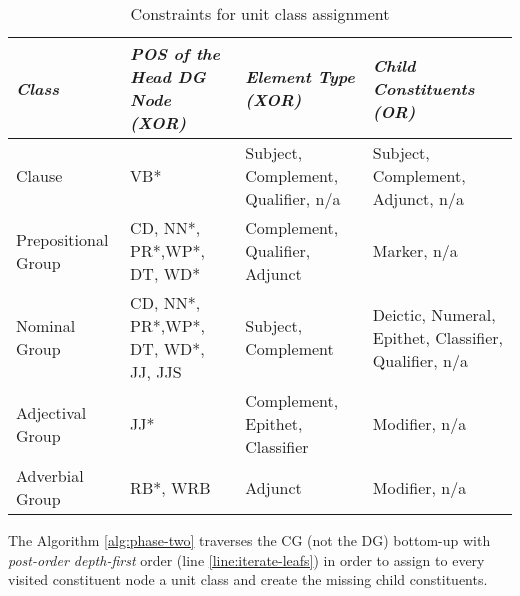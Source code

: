 \begin{table}[!ht]
\centering
\begin{tabulary}{\textwidth}{|L|L|L|L|}
\hline
\textit{Class} & \textit{POS of the Head DG Node (XOR)} & \textit{Element Type (XOR)} & \textit{Child Constituents (OR)} \\ \hline
Clause              & VB* & Subject, Complement, Qualifier, n/a & Subject, Complement, Adjunct, n/a \\ \hline
Prepositional Group & CD, NN*, PR*,WP*, DT, WD* & Complement, Qualifier, Adjunct  & Marker, n/a \\ \hline
Nominal Group       & CD, NN*, PR*,WP*, DT, WD*, JJ, JJS & Subject, Complement & Deictic, Numeral, Epithet, Classifier, Qualifier, n/a \\ \hline
Adjectival Group    & JJ* & Complement, Epithet, Classifier & Modifier, n/a \\ \hline
Adverbial Group     & RB*, WRB & Adjunct & Modifier, n/a \\ \hline
\end{tabulary}
\caption{Constraints for unit class assignment}
\label{tab:class-constitions}
\end{table}

The Algorithm \ref{alg:phase-two} traverses the CG (not the DG) bottom-up with \textit{post-order depth-first} order (line \ref{line:iterate-leafs}) in order to assign to every visited constituent node a unit class and create the missing child constituents.

